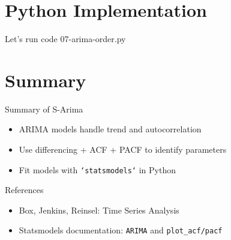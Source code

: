 \documentclass[aspectratio=169]{beamer}
\begin{document}
\section{Python Implementation}
\label{sec:orga24e08e}
\begin{frame}[label={sec:org6d40dc5}]{Let's run code}
07-arima-order.py
\end{frame}


\section{Summary}
\label{sec:org0b14245}
\begin{frame}[label={sec:org96a5939},fragile]{Summary of S-Arima}
 \begin{itemize}
\item ARIMA models handle trend and autocorrelation
\item Use differencing + ACF + PACF to identify parameters
\item Fit models with \texttt{`statsmodels`} in Python
\end{itemize}

\begin{block}{References}
\begin{itemize}
\item Box, Jenkins, Reinsel: \alert{Time Series Analysis}
\item Statsmodels documentation: \texttt{ARIMA} and \texttt{plot\_acf/pacf}
\end{itemize}
\end{block}
\end{frame}
\end{document}
